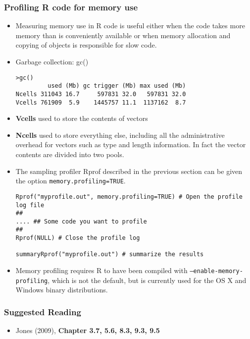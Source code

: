 \documentclass[10pt]{beamer}
\begin{document}
\begin{frame}
  \frametitle{Profiling R code for memory use}

  \begin{itemize}
  \item Measuring memory use in R code is useful either when the code
    takes more memory than is conveniently available or when memory
    allocation and copying of objects is responsible for slow code.

  \item Garbage collection: gc()

\begin{verbatim}
>gc()
         used (Mb) gc trigger (Mb) max used (Mb)
Ncells 311043 16.7     597831 32.0   597831 32.0
Vcells 761909  5.9    1445757 11.1  1137162  8.7
\end{verbatim}

  \item \textbf{Vcells} used to store the contents of vectors
  \item \textbf{Ncells} used to store everything else, including all the
    administrative overhead for vectors such as type and length
    information. In fact the vector contents are divided into two
    pools.

\item The sampling profiler Rprof described in the previous section can be given the option
\texttt{memory.profiling=TRUE}.
\begin{verbatim}
Rprof("myprofile.out", memory.profiling=TRUE) # Open the profile log file
##
.... ## Some code you want to profile
##
Rprof(NULL) # Close the profile log

summaryRprof("myprofile.out") # summarize the results

\end{verbatim}

\item Memory profiling requires R to have been compiled with
  \texttt{--enable-memory-profiling}, which is not the default, but is
  currently used for the OS X and Windows binary distributions.

  \end{itemize}

\end{frame}

\begin{frame}
  \frametitle{Suggested Reading}

  \begin{itemize}
  \item Jones (2009), \textbf{Chapter 3.7, 5.6, 8.3, 9.3, 9.5}



  \end{itemize}

\end{frame}
\end{document}
